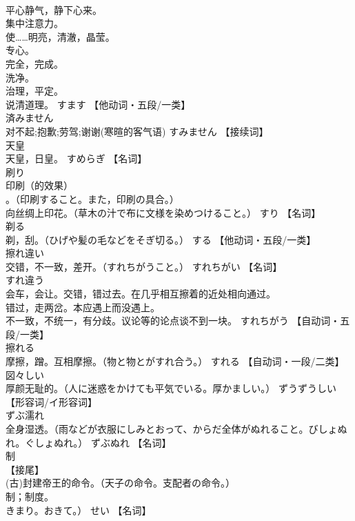 \documentclass[8pt]{extreport}
\begin{document}
\begin{CJK}{UTF8}{min}
\\	平心静气，静下心来。 
\\	集中注意力。 
\\	使……明亮，清澈，晶莹。 
\\	专心。 
\\	完全，完成。 
\\	洗净。 
\\	治理，平定。 
\\	说清道理。	すます		【他动词・五段/一类】
\\	済みません	
\\	对不起;抱歉;劳驾;谢谢(寒暄的客气语)	すみません		【接续词】
\\	天皇	
\\	天皇，日皇。	すめらぎ		【名词】
\\	刷り	
\\	印刷（的效果）
\\	。（印刷すること。また，印刷の具合。） 
\\	向丝绸上印花。（草木の汁で布に文様を染めつけること。）	すり		【名词】
\\	剃る	
\\	剃，刮。（ひげや髪の毛などをそぎ切る。）	する		【他动词・五段/一类】
\\	擦れ違い	
\\	交错，不一致，差开。（すれちがうこと。）	すれちがい		【名词】
\\	すれ違う	
\\	会车，会让。交错，错过去。在几乎相互擦着的近处相向通过。 
\\	错过，走两岔。本应遇上而没遇上。 
\\	不一致，不统一，有分歧。议论等的论点谈不到一块。	すれちがう		【自动词・五段/一类】
\\	擦れる	
\\	摩擦，蹭。互相摩擦。（物と物とがすれ合う。）	すれる		【自动词・一段/二类】
\\	図々しい	
\\	厚颜无耻的。（人に迷惑をかけても平気でいる。厚かましい。）	ずうずうしい		【形容词/イ形容词】
\\	ずぶ濡れ	
\\	全身湿透。（雨などが衣服にしみとおって、からだ全体がぬれること。びしょぬれ。ぐしょぬれ。）	ずぶぬれ		【名词】
\\	制	
\\	【接尾】 
\\	(古)封建帝王的命令。（天子の命令。支配者の命令。） 
\\	制；制度。
\\	きまり。おきて。）	せい		【名词】

\end{CJK}
\end{document}
